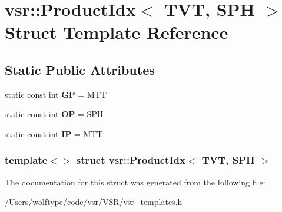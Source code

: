 \hypertarget{structvsr_1_1_product_idx_3_01_t_v_t_00_01_s_p_h_01_4}{\section{vsr\-:\-:Product\-Idx$<$ T\-V\-T, S\-P\-H $>$ Struct Template Reference}
\label{structvsr_1_1_product_idx_3_01_t_v_t_00_01_s_p_h_01_4}
}
\subsection*{Static Public Attributes}
\begin{DoxyCompactItemize}
\item 
\hypertarget{structvsr_1_1_product_idx_3_01_t_v_t_00_01_s_p_h_01_4_a51d970203c0cfe816bd0acb804fd93d8}{static const int {\bfseries G\-P} = M\-T\-T}\label{structvsr_1_1_product_idx_3_01_t_v_t_00_01_s_p_h_01_4_a51d970203c0cfe816bd0acb804fd93d8}

\item 
\hypertarget{structvsr_1_1_product_idx_3_01_t_v_t_00_01_s_p_h_01_4_a52c68e5b60803c626d1643f006f89504}{static const int {\bfseries O\-P} = S\-P\-H}\label{structvsr_1_1_product_idx_3_01_t_v_t_00_01_s_p_h_01_4_a52c68e5b60803c626d1643f006f89504}

\item 
\hypertarget{structvsr_1_1_product_idx_3_01_t_v_t_00_01_s_p_h_01_4_a71119787ff1d80f6e81c75a056978471}{static const int {\bfseries I\-P} = M\-T\-T}\label{structvsr_1_1_product_idx_3_01_t_v_t_00_01_s_p_h_01_4_a71119787ff1d80f6e81c75a056978471}

\end{DoxyCompactItemize}
\subsubsection*{template$<$$>$ struct vsr\-::\-Product\-Idx$<$ T\-V\-T, S\-P\-H $>$}



The documentation for this struct was generated from the following file\-:\begin{DoxyCompactItemize}
\item 
/\-Users/wolftype/code/vsr/\-V\-S\-R/vsr\-\_\-templates.\-h\end{DoxyCompactItemize}
